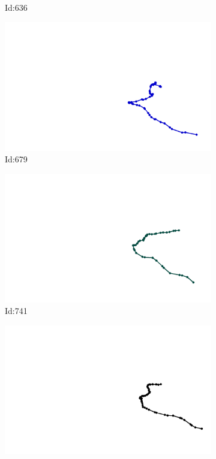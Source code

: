 \documentclass[12pt,twoside]{report}
\begin{document}
\begin{figure}
\begin{subfigure}[b]{0.20\textwidth}
\caption{Id:636}
\end{subfigure}
\begin{subfigure}[b]{0.20\textwidth}
\centering
\includegraphics[width=\textwidth]{../trajectories/679.png}
\caption{Id:679}
\end{subfigure}
\begin{subfigure}[b]{0.20\textwidth}
\centering
\includegraphics[width=\textwidth]{../trajectories/741.png}
\caption{Id:741}
\end{subfigure}
\begin{subfigure}[b]{0.20\textwidth}
\centering
\includegraphics[width=\textwidth]{../trajectories/773.png}

\end{subfigure}
\end{figure}
\end{document}
